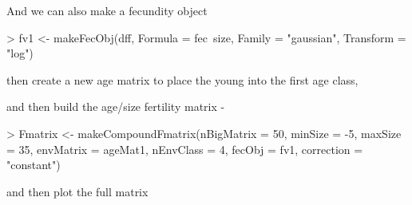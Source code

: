 \documentclass{article}
\begin{document}
And we can also make a fecundity object
\begin{Schunk}
\begin{Sinput}
> fv1 <- makeFecObj(dff, Formula = fec~size,
                      Family = "gaussian",
                      Transform = "log")
\end{Sinput}
\end{Schunk}
then create a new age matrix to place the young into the first age class,
\begin{Schunk}
\end{Schunk}
and then build the age/size fertility matrix -
\begin{Schunk}
\begin{Sinput}
> Fmatrix <- makeCompoundFmatrix(nBigMatrix = 50, minSize = -5,
                                 maxSize = 35,
                                 envMatrix = ageMat1,
  							   nEnvClass = 4,
                                 fecObj = fv1,
                                 correction = "constant")
\end{Sinput}
\end{Schunk}
and then plot the full matrix
\end{document}
